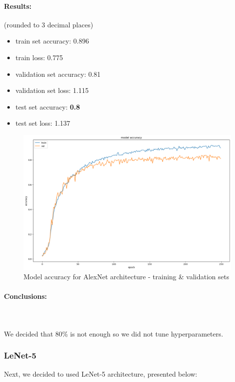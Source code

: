 \documentclass[12pt]{article}
\begin{document}
        \paragraph{Results:} (rounded to 3 decimal places)
          \begin{itemize}
            \item train set accuracy: 0.896
            \item train loss: 0.775
            \item validation set accuracy: 0.81
            \item validation set loss: 1.115
            \item test set accuracy: \textbf{0.8}
            \item test set loss: 1.137
          \end{itemize}
              \begin{figure}[H]
                \includegraphics[width=\linewidth]{images/alex-net.png}
                \caption{Model accuracy for AlexNet architecture - training \& validation sets}
                \label{fig:alex-net}
              \end{figure}
        \paragraph{Conclusions:} \mbox{} \\\\
        We decided that 80\% is not enough so we did not tune hyperparameters.
      \subsubsection{LeNet-5}
        Next, we decided to used LeNet-5 architecture, presented below:
        \inputminted[linenos]{python}{code/lenet.py}
\end{document}
